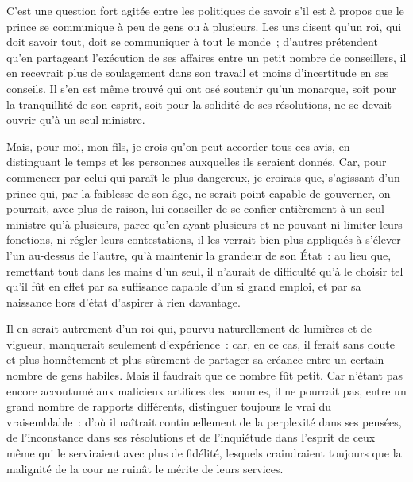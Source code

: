 \documentclass[french,twoside]{book} %
\begin{document}
C’est une question fort agitée entre les politiques de savoir s’il est à propos que le prince se communique à peu de gens ou à plusieurs. Les uns disent qu’un roi, qui doit savoir tout, doit se communiquer à tout le monde ; d’autres prétendent qu’en partageant l’exécution de ses affaires entre un petit nombre de conseillers, il en recevrait plus de soulagement dans son travail et moins d’incertitude en ses conseils. Il s’en est même trouvé qui ont osé soutenir qu’un monarque, soit pour la tranquillité de son esprit, soit pour la solidité de ses résolutions, ne se devait ouvrir qu’à un seul ministre.\par
Mais, pour moi, mon fils, je crois qu’on peut accorder tous ces avis, en distinguant le temps et les personnes auxquelles ils seraient donnés. Car, pour commencer par celui qui paraît le plus dangereux, je croirais que, s’agissant d’un prince qui, par la faiblesse de son âge, ne serait point capable de gouverner, on pourrait, avec plus de raison, lui conseiller de se confier entièrement à un seul ministre qu’à plusieurs, parce qu’en ayant plusieurs et ne pouvant ni limiter leurs fonctions, ni régler leurs contestations, il les verrait bien plus appliqués à s’élever l’un au-dessus de l’autre, qu’à maintenir la grandeur de son État : au lieu que, remettant tout dans les mains d’un seul, il n’aurait de difficulté qu’à le choisir tel qu’il fût en effet par sa suffisance capable d’un si grand emploi, et par sa naissance hors d’état d’aspirer à rien davantage.\par
Il en serait autrement d’un roi qui, pourvu naturellement de lumières et de vigueur, manquerait seulement d’expérience : car, en ce cas, il ferait sans doute et plus honnêtement et plus sûrement de partager sa créance entre un certain nombre de gens habiles. Mais il faudrait que ce nombre fût petit. Car n’étant pas encore accoutumé aux malicieux artifices des hommes, il ne pourrait pas, entre un grand nombre de rapports différents, distinguer toujours le vrai du vraisemblable : d’où il naîtrait continuellement de la perplexité dans ses pensées, de l’inconstance dans ses résolutions et de l’inquiétude dans l’esprit de ceux même qui le serviraient avec plus de fidélité, lesquels craindraient toujours que la malignité de la cour ne ruinât le mérite de leurs services.\par
\end{document}
